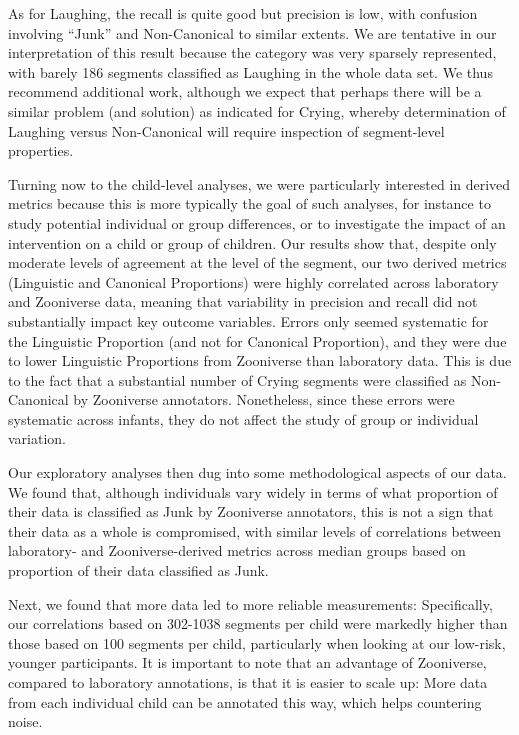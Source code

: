 \documentclass[
  english,
  ,man]{apa6}
\begin{document}
As for Laughing, the recall is quite good but precision is low, with confusion involving ``Junk'' and Non-Canonical to similar extents. We are tentative in our interpretation of this result because the category was very sparsely represented, with barely 186 segments classified as Laughing in the whole data set. We thus recommend additional work, although we expect that perhaps there will be a similar problem (and solution) as indicated for Crying, whereby determination of Laughing versus Non-Canonical will require inspection of segment-level properties.

Turning now to the child-level analyses, we were particularly interested in derived metrics because this is more typically the goal of such analyses, for instance to study potential individual or group differences, or to investigate the impact of an intervention on a child or group of children. Our results show that, despite only moderate levels of agreement at the level of the segment, our two derived metrics (Linguistic and Canonical Proportions) were highly correlated across laboratory and Zooniverse data, meaning that variability in precision and recall did not substantially impact key outcome variables. Errors only seemed systematic for the Linguistic Proportion (and not for Canonical Proportion), and they were due to lower Linguistic Proportions from Zooniverse than laboratory data. This is due to the fact that a substantial number of Crying segments were classified as Non-Canonical by Zooniverse annotators. Nonetheless, since these errors were systematic across infants, they do not affect the study of group or individual variation.

Our exploratory analyses then dug into some methodological aspects of our data. We found that, although individuals vary widely in terms of what proportion of their data is classified as Junk by Zooniverse annotators, this is not a sign that their data as a whole is compromised, with similar levels of correlations between laboratory- and Zooniverse-derived metrics across median groups based on proportion of their data classified as Junk.

Next, we found that more data led to more reliable measurements: Specifically, our correlations based on 302-1038 segments per child were markedly higher than those based on 100 segments per child, particularly when looking at our low-risk, younger participants. It is important to note that an advantage of Zooniverse, compared to laboratory annotations, is that it is easier to scale up: More data from each individual child can be annotated this way, which helps countering noise.
\end{document}
